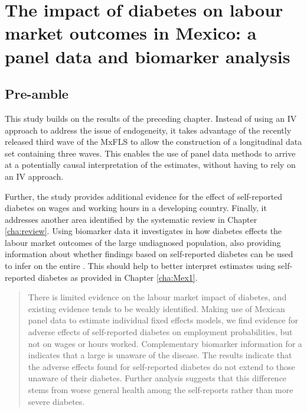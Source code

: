 \clearpage

 \newpage 
\acresetall  %
\chapter{\label{cha:Mex2}The impact of diabetes on labour market outcomes in Mexico: a panel data and biomarker analysis}
\section*{Pre-amble}

This study builds on the results of the preceding chapter. Instead of using an \ac{IV} approach to address the issue of endogeneity, it takes advantage of the recently released third wave of the \ac{MxFLS} to allow the construction of a longitudinal data set containing three waves. This enables the use of panel data methods to arrive at a potentially causal interpretation of the estimates, without having to rely on an \ac{IV} approach.

Further, the study provides additional evidence for the effect of self-reported diabetes on wages and working hours in a developing country. Finally, it addresses another area identified by the systematic review in Chapter \ref{cha:review}. Using biomarker data it investigates in how diabetes effects the labour market outcomes of the large undiagnosed population, also providing information about whether findings based on self-reported diabetes can be used to infer on the entire \DIFdelbegin {}\DIFdelend \DIFaddbegin {}\DIFaddend . This should help to better interpret estimates using self-reported diabetes as provided in Chapter \ref{cha:Mex1}.

 \newpage 
\begin{abstract}
There is limited evidence on the labour market impact of diabetes, and existing evidence tends to be weakly identified. Making use of Mexican panel data to estimate individual fixed effects models, we find evidence for adverse effects of self-reported diabetes on employment probabilities, but not on wages or hours worked. Complementary biomarker information for a \DIFdelbegin {}\DIFdelend \DIFaddbegin {}\DIFaddend indicates that a large \DIFdelbegin {}\DIFdelend \DIFaddbegin {}\DIFaddend is unaware of the disease. The results indicate that the adverse effects found for self-reported diabetes do not extend to those unaware of their diabetes. Further analysis suggests that this difference stems from worse general health among the self-reports rather than more severe diabetes.
\end{abstract}



